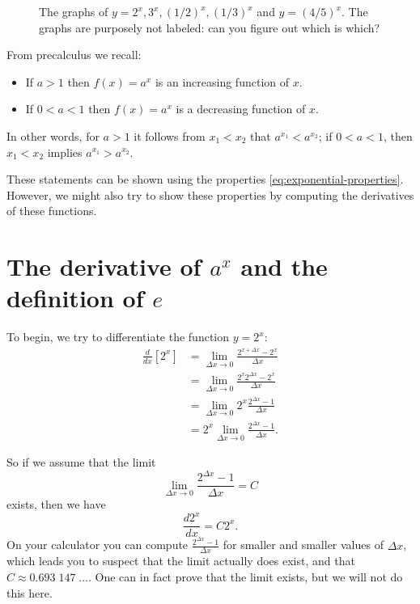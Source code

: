 \begin{figure}[t]\centering
  
  \caption{The graphs of $y=2^x, 3^x, (1/2)^x, (1/3)^x$ and $y=(4/5)^x$.
    The graphs are purposely not labeled: can you figure out which is which?}
  \label{fig:07expplot}
\end{figure}




From precalculus we recall:
\begin{itemize}
\item If $a>1$ then $f(x)=a^x$ is an increasing function of $x$.
\item If $0<a<1$ then $f(x)=a^x$ is a decreasing function of $x$.
\end{itemize}
In other words, for $a>1$ it follows from $x_1<x_2$ that
$a^{x_1}<a^{x_2}$; if $0<a<1$, then $x_1<x_2$ implies $a^{x_1} >
a^{x_2}$.

These statements can be shown using the properties \ref{eq:exponential-properties}.  However, we might also try to show these properties by computing the derivatives of these functions.


\section{The derivative of $a^x$ and the definition of $e$} %
To begin, we try to differentiate the function $y=2^x$:
\begin{align*}
  \frac{d}{dx}\left[ 2^x \right]
  & = \lim_{\Delta x\to0}\frac{2^{x+\Delta x}-2^x}{\Delta x} \\
  & = \lim_{\Delta x\to0}\frac{2^{x}2^{\Delta x}-2^x}{\Delta x} \\
  & = \lim_{\Delta x\to0}2^x\frac{2^{\Delta x}-1}{\Delta x} \\
  & = 2^x \lim_{\Delta x\to0}\frac{2^{\Delta x}-1}{\Delta x}.
\end{align*}




So if we assume that the limit
\[
\lim_{\Delta x\to0}\frac{2^{\Delta x}-1}{\Delta x}=C
\]
exists, then we have
\begin{equation}
  \label{eq:derivativeof2x}
  \frac{d 2^x}{dx} = C 2^x.
\end{equation}
On your calculator you can compute $\frac{2^{\Delta x}-1}{\Delta x}$
for smaller and smaller values of $\Delta x$, which leads you to
suspect that the limit actually does exist, and that $C\approx
0.693\;147\;\ldots$. One can in fact prove that the limit exists, but
we will not do this here.




